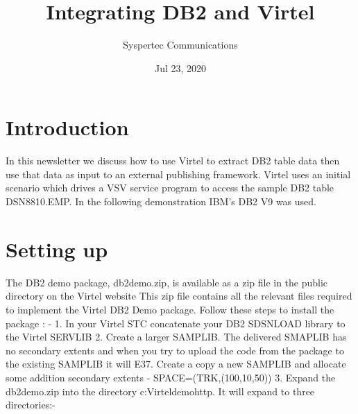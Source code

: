 \documentclass[letterpaper,10pt,english]{sphinxmanual}
\title{Integrating DB2 and Virtel}
\date{Jul 23, 2020}
\author{Syspertec Communications}
\begin{document}
\pagestyle{empty}
\sphinxmaketitle
\pagestyle{plain}
\sphinxtableofcontents
\pagestyle{normal}
\label{\detokenize{TN201906::doc}}



\chapter{Introduction}
\label{\detokenize{TN201906:introduction}}
In this newsletter we discuss how to use Virtel to extract DB2 table data then use that data as input to an external publishing framework. Virtel uses an initial scenario which drives a VSV service program to access the sample DB2 table DSN8810.EMP. In the following demonstration IBM’s DB2 V9 was used.


\chapter{Setting up}
\label{\detokenize{TN201906:setting-up}}
The DB2 demo package, db2demo.zip, is available as a zip file in the public directory on the Virtel website  This zip file contains all the relevant files required to implement the Virtel DB2 Demo package. Follow these steps to install the package : -
1. In your Virtel STC concatenate your DB2 SDSNLOAD library to the Virtel SERVLIB
2. Create a larger SAMPLIB. The delivered SMAPLIB has no secondary extents and when you try to upload the code from the package to the existing SAMPLIB it will E37. Create a copy a new SAMPLIB and allocate some addition secondary extents - SPACE=(TRK,(100,10,50))
3. Expand the db2demo.zip into the directory c:Virteldemohttp. It will expand to three directories:-
\end{document}

